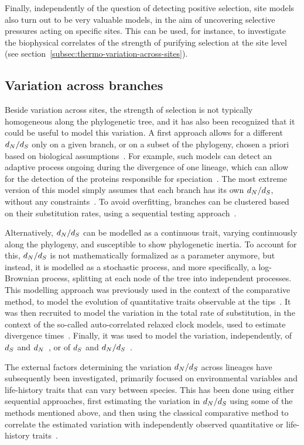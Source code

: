 Finally, independently of the question of detecting positive selection, site models also turn out to be very valuable models, in the aim of uncovering selective pressures acting on specific sites.
This can be used, for instance, to investigate the biophysical correlates of the strength of purifying selection at the site level (see section~\ref{subsec:thermo-variation-across-sites}).

\subsection{Variation across branches}
\label{subsec:variation-across-branches}

Beside variation across sites, the strength of selection is not typically homogeneous along the phylogenetic tree, and it has also been recognized that it could be useful to model this variation.
A first approach allows for a different $d_N / d_S$ only on a given branch, or on a subset of the phylogeny, chosen a priori based on biological assumptions~\citep{Yang1998}.
For example, such models can detect an adaptive process ongoing during the divergence of one lineage, which can allow for the detection of the proteins responsible for speciation~\citep{Yang1998, Zhang2004}.
The most extreme version of this model simply assumes that each branch has its own $d_N / d_S$, without any constraints~\citep{Popadin2007}.
To avoid overfitting, branches can be clustered based on their \gls{substitution} rates, using a sequential testing approach~\citep{Dutheil2012}.

Alternatively, $d_N / d_S$ can be modelled as a continuous trait, varying continuously along the phylogeny, and susceptible to show phylogenetic inertia.
To account for this, $d_N / d_S$ is not mathematically formalized as a parameter anymore, but instead, it is modelled as a stochastic process, and more specifically, a log-Brownian process, splitting at each node of the tree into independent processes.
This modelling approach was previously used in the context of the comparative method, to model the evolution of quantitative traits observable at the tips~\citep{Felsenstein1985, Huelsenbeck2003}.
It was then recruited to model the variation in the total rate of \gls{substitution}, in the context of the so-called auto-correlated relaxed clock models, used to estimate divergence times~\citep{Thorne1998}.
Finally, it was used to model the variation, independently, of $d_S$ and $d_N$~\citep{Seo2004}, or of $d_S$ and $d_N / d_S$~\citep{Lartillot2011}.

The external factors determining the variation $d_N / d_S$ across lineages have subsequently been investigated, primarily focused on environmental variables and life-history traits that can vary between species.
This has been done using either sequential approaches, first estimating the variation in $d_N / d_S$ using some of the methods mentioned above, and then using the classical comparative method to correlate the estimated variation with independently observed quantitative or life-history traits~\citep{Popadin2007, Lanfear2010, Romiguier2014}.

